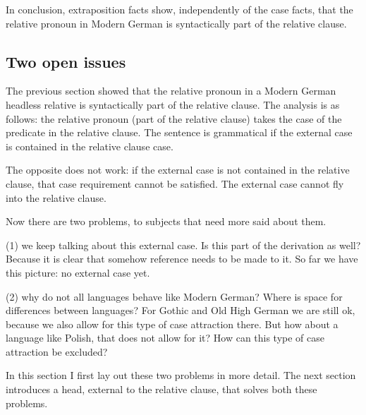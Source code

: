 In conclusion, extraposition facts show, independently of the case facts, that the relative pronoun in Modern German is syntactically part of the relative clause.


\subsection{Two open issues}

The previous section showed that the relative pronoun in a Modern German headless relative is syntactically part of the relative clause. The analysis is as follows: the relative pronoun (part of the relative clause) takes the case of the predicate in the relative clause. The sentence is grammatical if the external case is contained in the relative clause case.

The opposite does not work: if the external case is not contained in the relative clause, that case requirement cannot be satisfied. The external case cannot fly into the relative clause.

Now there are two problems, to subjects that need more said about them.

(1) we keep talking about this external case. Is this part of the derivation as well? Because it is clear that somehow reference needs to be made to it. So far we have this picture: no external case yet. %

(2) why do not all languages behave like Modern German? Where is space for differences between languages? For Gothic and Old High German we are still ok, because we also allow for this type of case attraction there. But how about a language like Polish, that does not allow for it? How can this type of case attraction be excluded?


In this section I first lay out these two problems in more detail. The next section introduces a head, external to the relative clause, that solves both these problems.


